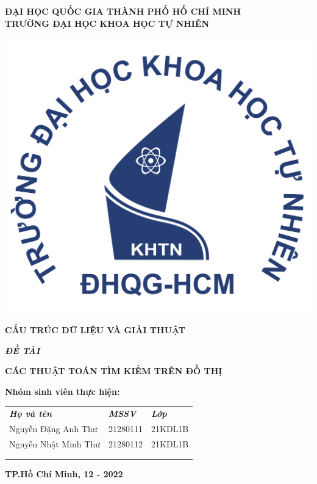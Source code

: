 \begin{titlepage}
\begin{center}
    \textbf{ĐẠI HỌC QUỐC GIA THÀNH PHỐ HỐ CHÍ MINH}\\
    \textbf{TRƯỜNG ĐẠI HỌC KHOA HỌC TỰ NHIÊN}
\end{center}
\vspace{8pt}
\begin{center}
    \includegraphics[scale=0.6]{pic/hcmus.png}
    
    \vspace{12pt}
    
     \fontsize{14pt}{17pt}\selectfont  
    \textbf{CẤU TRÚC DỮ LIỆU VÀ GIẢI THUẬT}
\end{center}
\begin{flushleft}
    \fontsize{14pt}{17pt}\selectfont  
    \textbf{\textsl{ĐỀ TÀI}}
\end{flushleft}
\begin{center}
    \fontsize{19pt}{17pt}\selectfont 
    \textbf{\textrm{CÁC THUẬT TOÁN TÌM KIẾM TRÊN ĐỒ THỊ}}
\end{center}
\vspace{14pt}
 \fontsize{13pt}{17pt}\selectfont  
 \hspace{2cm}
\textbf{Nhóm sinh viên thực hiện:}
\begin{center}
\begin{tabular}{p{}p{}p{}}
 {\it \textbf{Họ và tên}} & {\it \textbf{MSSV}} & {\it \textbf{Lớp}} \\ 
 Nguyễn Đặng Anh Thư & 21280111 & 21KDL1B \\  
 Nguyễn Nhật Minh Thư & 21280112 & 21KDL1B  \\
 & & \\ \\
\end{tabular}
\end{center}

\begin{center}
    \vspace{17pt}
    \textbf{TP.Hồ Chí Minh, 12 - 2022}
\end{center}


\end{titlepage}

